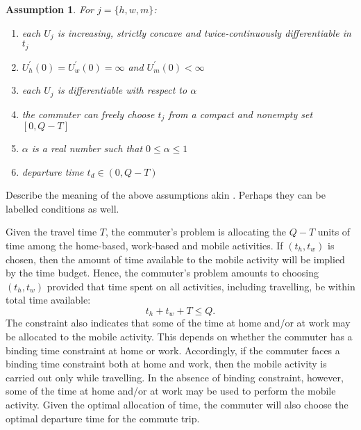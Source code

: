 \documentclass[12pt,a4paper,british]{article}
\newtheorem{assumption}{Assumption}[section]
\begin{document}
\begin{assumption}
    For $j=\{h,w,m\}$: 
    \begin{enumerate}
        \item each $U_j$ is increasing, strictly concave and twice-continuously differentiable in $t_j$
        \item $U_{h}^{\prime}\left(0\right) = U_{w}^{\prime}\left(0\right) = \infty$ and $U_{m}^{\prime}\left(0\right)<\infty$
        \item each $U_j$ is differentiable with respect to $\alpha$
        \item the commuter can freely choose $t_j$ from a compact and nonempty set $[0, Q-T]$
        \item $\alpha$ is a real number such that $0 \leq \alpha \leq 1$
        \item departure time $t_d \in (0, Q-T)$
    \end{enumerate}
\end{assumption}

Describe the meaning of the above assumptions akin \citet{Fosgerau_endogenousscheduling_2017}. Perhaps they can be labelled conditions as well.   

Given the travel time $T$, the commuter's problem is allocating the $Q-T$ units of time among the home-based, work-based and mobile activities. If $\left(t_{h},t_{w}\right)$ is chosen, then the amount of time available to the mobile activity will be implied by the time budget. Hence, the commuter's problem amounts to choosing $\left(t_{h},t_{w}\right)$ provided that time spent on all activities, including travelling, be within total time available:  
\begin{equation}
t_{h}+t_{w}+T\leq Q.
\label{constraint0}
\end{equation}
The constraint also indicates that some of the time at home and/or at work may be allocated to the mobile activity. This depends on whether the commuter has a binding time constraint at home or work. Accordingly, if the commuter faces a binding time constraint both at home and work, then the mobile activity is carried out only while travelling. In the absence of binding constraint, however, some of the time at home and/or at work may be used to perform the mobile activity. Given the optimal allocation of time, the commuter will also choose the optimal departure time for the commute trip.

\end{document}
